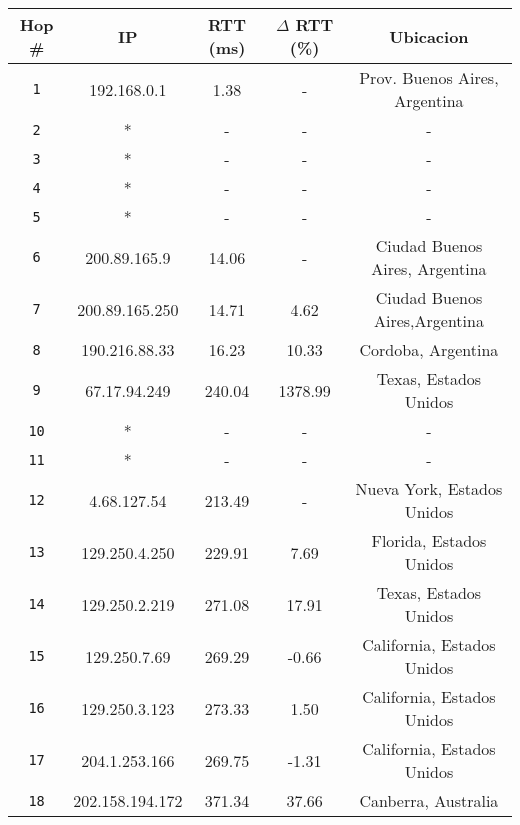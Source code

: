 \begin{table}[ht]\begin{center}
    \begin{tabular}{|c|c|c|c|c|}
    \hline
    \textbf{Hop \#} & \textbf{IP}& \textbf{RTT (ms)} & \textbf{$\Delta$ RTT (\%)} & \textbf{Ubicacion} \\ \hline
    \texttt{1} & 192.168.0.1      & 1.38    & -       & Prov. Buenos Aires, Argentina   \\ \hline
    \texttt{2} & *                & -       & -       & -   \\ \hline
    \texttt{3} & *                & -       & -       & -   \\ \hline
    \texttt{4} & *                & -       & -       & -   \\ \hline
    \texttt{5} & *                & -       & -       & -   \\ \hline
    \texttt{6} & 200.89.165.9     & 14.06   & -       & Ciudad Buenos Aires, Argentina    \\ \hline
    \texttt{7} & 200.89.165.250   & 14.71    & 4.62   & Ciudad Buenos Aires,Argentina   \\ \hline
    \texttt{8} & 190.216.88.33    & 16.23    & 10.33  & Cordoba, Argentina   \\ \hline
    \texttt{9} & 67.17.94.249     & 240.04  & 1378.99 & Texas, Estados Unidos   \\ \hline
    \texttt{10} & *               & -       & -       & -   \\ \hline
    \texttt{11} & *               & -       & -       & -    \\ \hline
    \texttt{12} & 4.68.127.54     & 213.49  & -       & Nueva York, Estados Unidos   \\ \hline
    \texttt{13} & 129.250.4.250   & 229.91  & 7.69    & Florida, Estados Unidos   \\ \hline
    \texttt{14} & 129.250.2.219   & 271.08  & 17.91   & Texas, Estados Unidos   \\ \hline
    \texttt{15} & 129.250.7.69    & 269.29  & -0.66   & California, Estados Unidos   \\ \hline
    \texttt{16} & 129.250.3.123   & 273.33  & 1.50    & California, Estados Unidos    \\ \hline
    \texttt{17} & 204.1.253.166   & 269.75  & -1.31   & California, Estados Unidos   \\ \hline
    \texttt{18} & 202.158.194.172 & 371.34  & 37.66   & Canberra, Australia   \\ \hline

\end{tabular}
\end{center}
\end{table}
